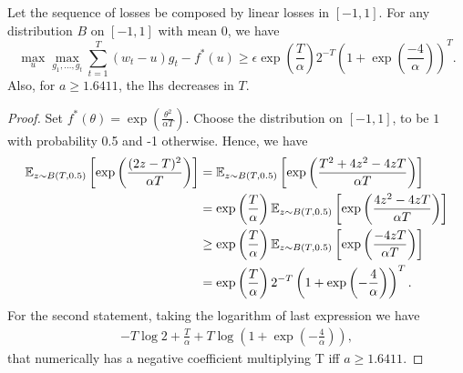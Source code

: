 \begin{cor}
Let the sequence of losses be composed by linear losses in $[-1,1]$.
For any distribution $B$ on $[-1,1]$ with mean 0, we have 
\[
\max_u \max_{g_1, \ldots, g_t} \sum_{t=1}^T (w_t-u) g_t - f^*(u) 
\geq \epsilon \exp\left(\frac{T}{\alpha}\right) 2^{-T} \left(1+\exp(\frac{-4}{\alpha})\right)^T.
\]
Also, for $a\geq1.6411$, the lhs decreases in $T$.
\end{cor}
\begin{proof}
Set $f^*(\theta)=\exp\left(\frac{\theta^2}{\alpha T}\right)$.
Choose the distribution on $[-1,1]$, to be $1$ with probability 0.5 and -1 otherwise.
Hence, we have
\begin{align*}
\mathbb{E}_{z\sim B(T,0.5)} \left[\exp\left(\frac{(2 z-T)^2}{\alpha T}\right)\right]
& =\mathbb{E}_{z\sim B(T,0.5)} \left[\exp\left(\frac{T^2 + 4 z^2 - 4 z T }{\alpha T}\right)\right] \\
& =\exp\left(\frac{T}{\alpha}\right) \mathbb{E}_{z\sim B(T,0.5)} \left[\exp\left(\frac{4 z^2 - 4 z T }{\alpha T}\right)\right] \\
& \geq\exp\left(\frac{T}{\alpha}\right) \mathbb{E}_{z\sim B(T,0.5)} \left[\exp\left(\frac{- 4 z T }{\alpha T}\right)\right] \\
& =\exp\left(\frac{T}{\alpha}\right) 2^{-T} \left(1+\exp\left(-\frac{4}{\alpha}\right)\right)^T.
\end{align*}
For the second statement, taking the logarithm of last expression we have
\begin{align}
-T\log 2+ \frac{T}{\alpha} + T \log \left(1+\exp\left(-\frac{4}{\alpha}\right)\right),
\end{align}
that numerically has a negative coefficient multiplying T iff $a\geq1.6411$.
\end{proof}

